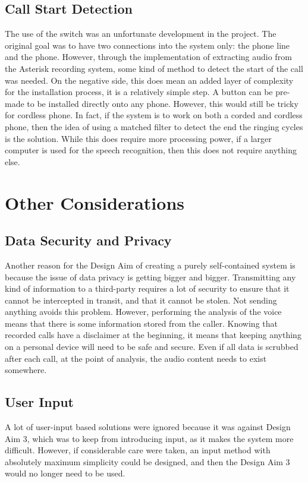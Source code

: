 \documentclass[main.tex]{subfiles}
\begin{document}
\subsection{Call Start Detection}
The use of the switch was an unfortunate development in the project. The original goal was to have two connections into the system only: the phone line and the phone. However, through the implementation of extracting audio from the Asterisk recording system, some kind of method to detect the start of the call was needed. On the negative side, this does mean an added layer of complexity for the installation process, it is a relatively simple step. A button can be pre-made to be installed directly onto any phone. However, this would still be tricky for cordless phone. In fact, if the system is to work on both a corded and cordless phone, then the idea of using a matched filter to detect the end the ringing cycles is the solution. While this does require more processing power, if a larger computer is used for the speech recognition, then this does not require anything else.

\section{Other Considerations}

\subsection{Data Security and Privacy}
Another reason for the Design Aim of creating a purely self-contained system is because the issue of data privacy is getting bigger and bigger. Transmitting any kind of information to a third-party requires a lot of security to ensure that it cannot be intercepted in transit, and that it cannot be stolen. Not sending anything avoids this problem. However, performing the analysis of the voice means that there is some information stored from the caller. Knowing that recorded calls have a disclaimer at the beginning, it means that keeping anything on a personal device will need to be safe and secure. Even if all data is scrubbed after each call, at the point of analysis, the audio content needs to exist somewhere.

\subsection{User Input}
A lot of user-input based solutions were ignored because it was against Design Aim 3, which was to keep from introducing input, as it makes the system more difficult. However, if considerable care were taken, an input method with absolutely maximum simplicity could be designed, and then the Design Aim 3 would no longer need to be used.
\end{document}
